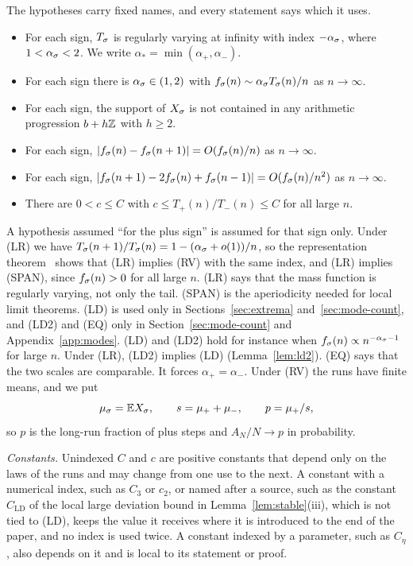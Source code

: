The hypotheses carry fixed names, and every statement says which it uses.
\begin{itemize}[leftmargin=4.5em,labelsep=0.8em]
\item[(RV)] For each sign, $T_\sigma$ is regularly varying at infinity with index
$-\alpha_\sigma$, where $1<\alpha_\sigma<2$. We write $\alpha_*=\min(\alpha_\plus,\alpha_\minus)$.
\item[(LR)] For each sign there is $\alpha_\sigma\in(1,2)$ with
$f_\sigma(n)\sim\alpha_\sigma T_\sigma(n)/n$ as $n\to\infty$.
\item[(SPAN)] For each sign, the support of $X_\sigma$ is not contained in any
arithmetic progression $b+h\mathbb{Z}$ with $h\ge2$.
\item[(LD)] For each sign, $|f_\sigma(n)-f_\sigma(n+1)|=O(f_\sigma(n)/n)$ as $n\to\infty$.
\item[(LD2)] For each sign, $|f_\sigma(n+1)-2f_\sigma(n)+f_\sigma(n-1)|=O(f_\sigma(n)/n^2)$ as $n\to\infty$.
\item[(EQ)] There are $0<c\le C$ with $c\le T_\plus(n)/T_\minus(n)\le C$ for all large $n$.
\end{itemize}
A hypothesis assumed ``for the plus sign'' is assumed for that sign only. Under
(LR) we have $T_\sigma(n+1)/T_\sigma(n)=1-(\alpha_\sigma+o(1))/n$, so the representation
theorem~\cite[Theorem~1.3.1]{bgt1989} shows that (LR) implies (RV) with the same
index, and (LR) implies (SPAN), since $f_\sigma(n)>0$ for all large $n$. (LR) says that the mass function is regularly varying, not only the
tail. (SPAN) is the aperiodicity needed for local limit theorems. (LD) is used only in
Sections~\ref{sec:extrema} and~\ref{sec:mode-count}, and (LD2) and (EQ) only in
Section~\ref{sec:mode-count} and Appendix~\ref{app:modes}. (LD) and (LD2) hold for instance
when $f_\sigma(n)\propto n^{-\alpha_\sigma-1}$ for large $n$. Under (LR), (LD2) implies (LD)
(Lemma~\ref{lem:ld2}). (EQ) says that the two scales are comparable. It forces
$\alpha_\plus=\alpha_\minus$. Under (RV) the
runs have finite means, and we put
\begin{equation}\label{eq:means}
 \mu_\sigma=\mathbb{E} X_\sigma,\qquad s=\mu_{+}+\mu_{-},\qquad p=\mu_{+}/s ,
\end{equation}
so $p$ is the long-run fraction of plus steps and $A_N/N\to p$ in probability.

\emph{Constants.} Unindexed $C$ and $c$ are positive constants that depend only
on the laws of the runs and may change from one use to the next. A constant with
a numerical index, such as $C_3$ or $c_2$, or named after a source, such as the
constant $C_{\mathrm{LD}}$ of the local large deviation bound in
Lemma~\ref{lem:stable}(iii), which is not tied to (LD), keeps the value it receives where it is introduced to the end
of the paper, and no index is used twice. A constant indexed by a parameter, such
as $C_\eta$, also depends on it and is local to its statement or proof.

